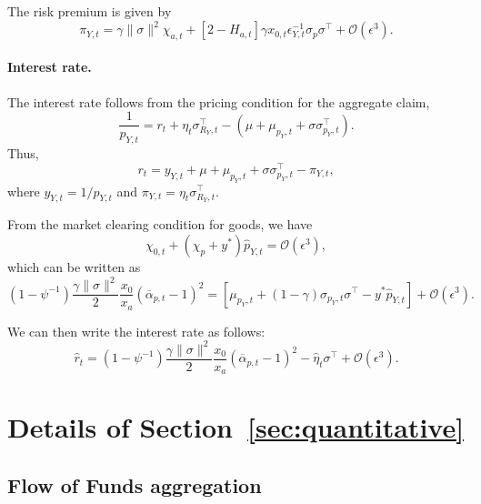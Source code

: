 The risk premium is given by
\begin{equation}
    \pi_{Y,t} = \gamma \|\sigma\|^2 \chi_{a,t}+ \left[2 - H_{a,t} \right] \gamma x_{0,t} \epsilon_{Y,t}^{-1} \sigma_p \sigma^\top+ \mathcal{O}(\epsilon^3).
\end{equation}

\paragraph{Interest rate.} 
The interest rate follows from the pricing condition for the aggregate claim,
\begin{equation}
    \frac{1}{p_{Y,t}}
    = r_t + \eta_t\sigma_{R_Y,t}^\top
    -\left(\mu+\mu_{p_Y,t}+\sigma\sigma_{p_Y,t}^\top\right).
\end{equation}
Thus,
\begin{equation}
    r_t
    = y_{Y,t}+\mu+\mu_{p_Y,t}+\sigma\sigma_{p_Y,t}^\top-\pi_{Y,t},
\end{equation}
where $y_{Y,t}=1/p_{Y,t}$ and $\pi_{Y,t}=\eta_t\sigma_{R_Y,t}^\top$.

From the market clearing condition for goods, we have   
\begin{equation}
\chi_{0,t} + (\chi_p + y^*) \hat{p}_{Y,t} = \mathcal{O}(\epsilon^3),
\end{equation}
which can be written as
\begin{equation}
    (1-\psi^{-1}) \frac{\gamma\|\sigma\|^2}{2} \frac{x_0}{x_a}(\overline{\alpha}_{p,t}-1)^2 = \left[ \mu_{p_Y,t} + (1-\gamma) \sigma_{p_Y,t} \sigma^\top- y^* \hat{p}_{Y,t} \right] +\mathcal{O}(\epsilon^3).
\end{equation}

We can then write the interest rate as follows:
\begin{equation}
    \hat{r}_t = (1-\psi^{-1}) \frac{\gamma\|\sigma\|^2}{2} \frac{x_0}{x_a}(\overline{\alpha}_{p,t}-1)^2 - \hat{\eta}_t \sigma^\top + \mathcal{O}(\epsilon^3).
\end{equation}


\section{Details of Section~\ref{sec:quantitative}}

\subsection{Flow of Funds aggregation}\label{app:fof_aggregation}

